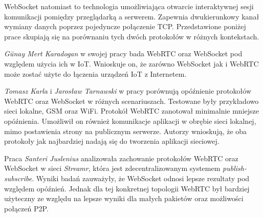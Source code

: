 \documentclass[language=polish,type=master]{aghmodern}
\begin{document}
WebSocket natomiast to technologia umożliwiająca otwarcie interaktywnej sesji komunikacji pomiędzy przeglądarką a serwerem.
Zapewnia dwukierunkowy kanał wymiany danych poprzez pojedyncze połączenie TCP.
Przedstawione poniżej prace skupiają się na porównaniu tych dwóch protokołów w różnych kontekstach.

\emph{G{\"u}nay Mert Karadogan} w swojej pracy \cite{websocket_webrtc_iot} bada WebRTC oraz WebSocket pod względem użycia ich w IoT\footnotemark{}.
Wnioskuje on, że zarówno WebSocket jak i WebRTC może zostać użyte do łączenia urządzeń IoT z Internetem.

\emph{Tomasz Karla} i \emph{Jarosław Tarnawski} w pracy \cite{websocket_webrtc_realtime} porównują opóźnienie protokołów WebRTC oraz WebSocket w różnych scenariuszach.
Testowane były przykładowo sieci lokalne, GSM oraz WiFi. Protokół WebRTC zanotował minimalnie mniejsze opóźnienia.
Umożliwił on również komunikacje aplikacji w obrębie sieci lokalnej\footnotemark{}, mimo postawienia strony na publicznym serwerze.
Autorzy wnioskują, że oba protokoły jak najbardziej nadają się do tworzenia aplikacji sieciowej.

Praca \cite{websocket_webrtc_streamr} \emph{Santeri Juslenius} analizowała zachowanie protokołów WebRTC oraz WebSocket w sieci \emph{Streamr}, która jest zdecentralizowanym systemem \emph{publish-subscribe}\footnotemark{}.
Wyniki badań zauważyły, że WebSocket odnosi lepsze rezultaty pod względem opóźnień.
Jednak dla tej konkretnej topologii WebRTC był bardziej użyteczny ze względu na lepsze wyniki dla małych pakietów oraz możliwości połączeń P2P.

\backmatter

\cleardoublepage
\listoffigures

\cleardoublepage
\listoftables

\cleardoublepage
\printbibliography
\end{document}
